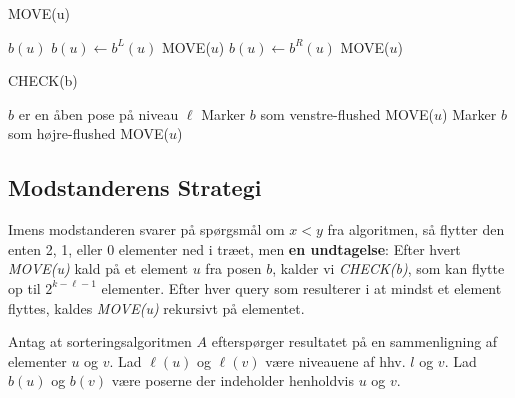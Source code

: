 \begin{algorithm}
	\caption{\label{alg:move} MOVE(u)}
	\begin{algorithmic}[1]
		\STATE $b(u)$ 
		\RETURN
		\STATE $b(u) \gets b^L(u)$
		\STATE MOVE($u$)
		\RETURN
		\STATE $b(u) \gets b^R(u)$
		\STATE MOVE($u$)
		\RETURN
		\ENDIF
	\end{algorithmic}
\end{algorithm}

\begin{algorithm}
	\caption{\label{alg:check} CHECK(b)}
	\begin{algorithmic}[1]
		\STATE $b$ er en åben pose på niveau $\ell$
		\STATE Marker $b$ som venstre-flushed 
		\STATE MOVE($u$)
		\RETURN
		\ENDIF
		\STATE Marker $b$ som højre-flushed 
		\STATE MOVE($u$)
		\RETURN
		\ENDIF
		\RETURN
	\end{algorithmic}
\end{algorithm}

\subsection{Modstanderens Strategi}%
\label{subsec:label}

Imens modstanderen svarer på spørgsmål om $x < y$ fra algoritmen, så flytter den enten 2, 1, eller 0 elementer ned i træet, men \textbf{en undtagelse}: Efter hvert \textit{MOVE(u)} kald på et element $u$ fra posen $b$, kalder vi \textit{CHECK(b)}, som kan flytte op til $2^{k-\ell -1}$ elementer. Efter hver query som resulterer i at mindst et element flyttes, kaldes \textit{MOVE(u)} rekursivt på elementet.

Antag at sorteringsalgoritmen $A$ efterspørger resultatet på en sammenligning af elementer $u$ og $v$. Lad \(\ell(u)\) og \(\ell(v)\) være niveauene af hhv. $l$ og $v$. Lad $b(u)$ og $b(v)$ være poserne der indeholder henholdvis $u$ og $v$.

